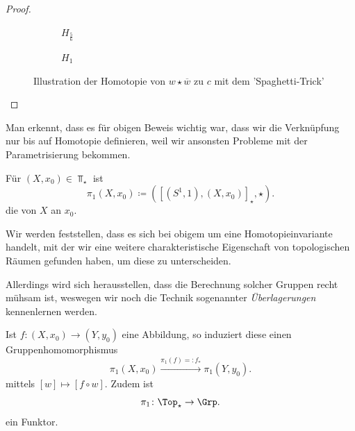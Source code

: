 \begin{proof}
\begin{figure}
\begin{subfigure}[b]{0.15\textwidth}
\begin{tikzpicture}[auto]
    \end{tikzpicture}
    \caption{$H_{\frac{5}{6}}$}
        \end{subfigure}
        \hfill
        \begin{subfigure}[b]{0.15\textwidth}
            \centering
    \caption{$H_1$}
        \end{subfigure}
        \caption{Illustration der Homotopie von $w \star \overline{w}$ zu $c$ mit dem 'Spaghetti-Trick'}
    \end{figure}
\end{proof}

\begin{oral}
    Man erkennt, dass es für obigen Beweis wichtig war, dass wir die Verknüpfung nur bis auf Homotopie definieren, weil wir ansonsten Probleme mit der Parametrisierung bekommen.
\end{oral}

\begin{definition}[Fundamentalgruppe]\label{def:fundamentalgruppe}
    Für $(X,x_0) \in \Top_{\star}$ ist 
    \[
        \pi_1(X,x_0) \coloneqq  ([(S^1,1),(X,x_0)]_{\star},\star)
    .\] 
    die  von $X$ an  $x_0$. 
\end{definition}

\begin{oral}
    Wir werden feststellen, dass es sich bei obigem um eine Homotopieinvariante handelt, mit der wir eine weitere charakteristische Eigenschaft von topologischen Räumen gefunden haben, um diese zu unterscheiden. 

    Allerdings wird sich herausstellen, dass die Berechnung solcher Gruppen recht mühsam ist, weswegen wir noch die Technik sogenannter \textit{Überlagerungen} kennenlernen werden.
\end{oral}

\begin{theorem}
    Ist $f\colon  (X,x_0) \to  (Y,y_0)$ eine Abbildung, so induziert diese einen Gruppenhomomorphismus
    \[
        \pi_1 (X,x_0) \stackrel{\pi_1(f) =: f_*}{\longrightarrow}   \pi_1(Y,y_0)
    .\] 
    mittels $[w] \mapsto [f \circ  w]$. Zudem ist
    \[
    \pi_1\colon  \Top_{\star} \to  \Grp
    .\] 
    ein Funktor.
\end{theorem}

